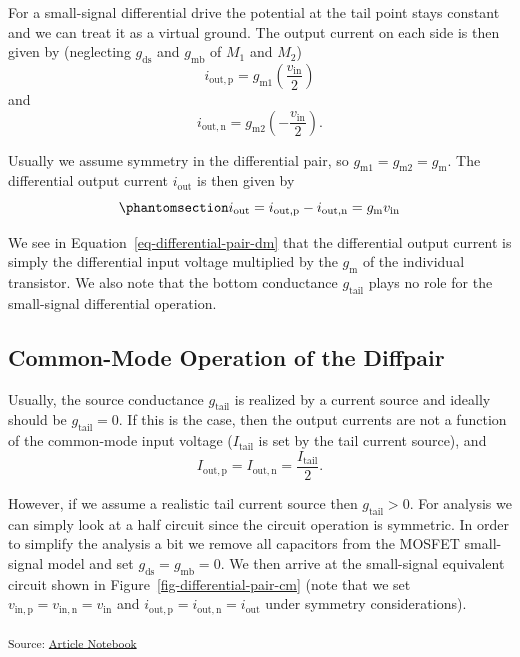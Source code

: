 \documentclass[
  a4paper,
  DIV=11,
  numbers=noendperiod]{scrartcl}
\begin{document}
For a small-signal differential drive the potential at the tail point
stays constant and we can treat it as a virtual ground. The output
current on each side is then given by (neglecting \(g_\mathrm{ds}\) and
\(g_\mathrm{mb}\) of \(M_1\) and \(M_2\)) \[
i_\mathrm{out,p} = g_\mathrm{m1} \left( \frac{v_\mathrm{in}}{2} \right)
\] and \[
i_\mathrm{out,n} = g_\mathrm{m2} \left( -\frac{v_\mathrm{in}}{2} \right).
\]

Usually we assume symmetry in the differential pair, so
\(g_\mathrm{m1} = g_\mathrm{m2} = g_\mathrm{m}\). The differential
output current \(i_\mathrm{out}\) is then given by
\begin{equation}\phantomsection\label{eq-differential-pair-dm}{
i_\mathrm{out} = i_\mathrm{out,p} - i_\mathrm{out,n} = g_\mathrm{m}v_\mathrm{in}
}\end{equation}

We see in Equation~\ref{eq-differential-pair-dm} that the differential
output current is simply the differential input voltage multiplied by
the \(g_\mathrm{m}\) of the individual transistor. We also note that the
bottom conductance \(g_\mathrm{tail}\) plays no role for the
small-signal differential operation.

\subsection{Common-Mode Operation of the
Diffpair}\label{common-mode-operation-of-the-diffpair}

Usually, the source conductance \(g_\mathrm{tail}\) is realized by a
current source and ideally should be \(g_\mathrm{tail} = 0\). If this is
the case, then the output currents are not a function of the common-mode
input voltage (\(I_\mathrm{tail}\) is set by the tail current source),
and \[
I_\mathrm{out,p} = I_\mathrm{out,n} = \frac{I_\mathrm{tail}}{2}.
\]

However, if we assume a realistic tail current source then
\(g_\mathrm{tail} > 0\). For analysis we can simply look at a half
circuit since the circuit operation is symmetric. In order to simplify
the analysis a bit we remove all capacitors from the MOSFET small-signal
model and set \(g_\mathrm{ds}= g_\mathrm{mb}= 0\). We then arrive at the
small-signal equivalent circuit shown in
Figure~\ref{fig-differential-pair-cm} (note that we set
\(v_\mathrm{in,p} = v_\mathrm{in,n} = v_\mathrm{in}\) and
\(i_\mathrm{out,p} = i_\mathrm{out,n} = i_\mathrm{out}\) under symmetry
considerations).

\textsubscript{Source:
\href{https://iic-jku.github.io/analog-circuit-design/index.qmd.html}{Article
Notebook}}
\end{document}
